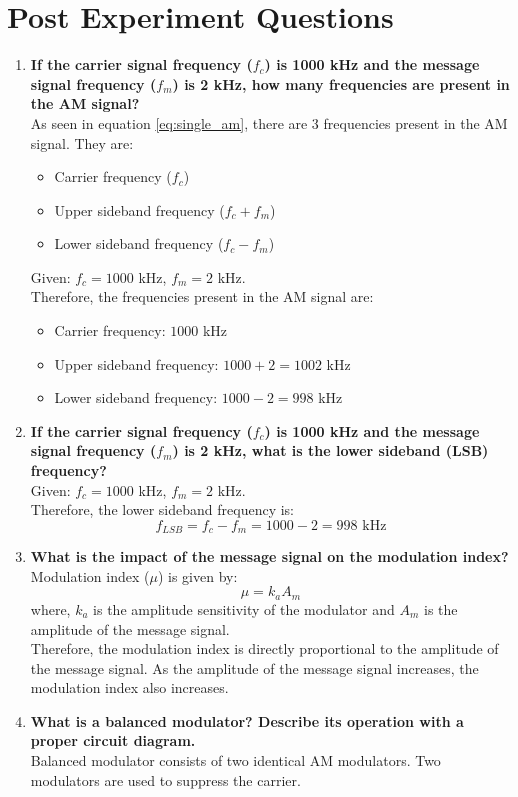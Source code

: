\section*{Post Experiment Questions}
\begin{enumerate}
     \item \textbf{If the carrier signal frequency ($f_c$) is 1000 kHz and the message signal frequency ($f_m$) is
        2 kHz, how many frequencies are present in the AM signal?} \\
        As seen in equation \ref{eq:single_am}, there are 3 frequencies present in the AM signal. They are:
        \begin{itemize}
            \item Carrier frequency ($f_c$)
            \item Upper sideband frequency ($f_c + f_m$)
            \item Lower sideband frequency ($f_c - f_m$)
        \end{itemize}
        Given: $f_c = 1000$ kHz, $f_m = 2$ kHz.\\
        Therefore, the frequencies present in the AM signal are:
        \begin{itemize}
            \item Carrier frequency: $1000$ kHz
            \item Upper sideband frequency: $1000 + 2 = 1002$ kHz
            \item Lower sideband frequency: $1000 - 2 = 998$ kHz
        \end{itemize}

        \item \textbf{If the carrier signal frequency ($f_c$) is 1000 kHz and the message signal frequency ($f_m$) is
        2 kHz, what is the lower sideband (LSB) frequency?} \\
        Given: $f_c = 1000$ kHz, $f_m = 2$ kHz.\\
        Therefore, the lower sideband frequency is:
        \[
            f_{LSB} = f_c - f_m = 1000 - 2 = 998 \text{ kHz}
        \]

        \item \textbf{What is the impact of the message signal on the modulation index?} \\
        Modulation index ($\mu$) is given by:
        \[
            \mu = k_a A_m
        \]
        where, $k_a$ is the amplitude sensitivity of the modulator and $A_m$ is the amplitude of the message signal.\\
        Therefore, the modulation index is directly proportional to the amplitude of the message signal. As the amplitude of the message signal increases, the modulation index also increases. 
        \item \textbf{What is a balanced modulator? Describe its operation with a proper circuit diagram.}\\
        Balanced modulator consists of two identical AM modulators. Two modulators are used to suppress the carrier.
        

\end{enumerate}
